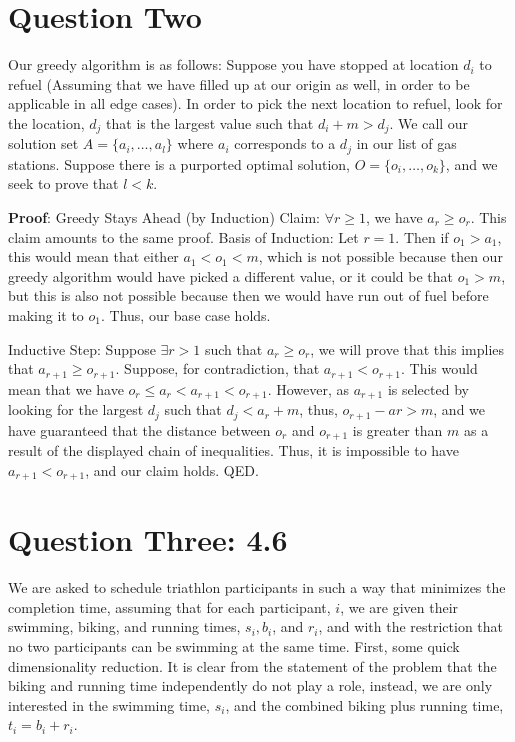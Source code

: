 \documentclass[11pt,letterpaper]{article}
\begin{document}
\section*{Question Two}
Our greedy algorithm is as follows: Suppose you have stopped at location $d_i$ to refuel (Assuming that we have filled up at our origin as well, in order to be applicable in all edge cases). In order to pick the next location to refuel, look for the location, $d_j$ that is the largest value such that $d_i + m > d_j$. 
We call our solution set $A = \{ a_i,\ldots, a_l\}$ where $a_i$ corresponds to a $d_j$ in our list of gas stations. Suppose there is a purported optimal solution, $O = \{o_i, \ldots, o_k\}$, and we seek to prove that $l < k$. 

\textbf{Proof}: Greedy Stays Ahead (by Induction)
Claim: $\forall r \geq 1$, we have $a_r \geq o_r$. This claim amounts to the same proof. 
Basis of Induction: Let $r=1$. Then if $o_1 > a_1$, this would mean that either $a_1 < o_1 < m$, which is not possible because then our greedy algorithm would have picked a different value, or it could be that $o_1 > m$, but this is also not possible because then we would have run out of fuel before making it to $o_1$. Thus, our base case holds. 

Inductive Step: Suppose $\exists r > 1$ such that $a_r \geq o_r$, we will prove that this implies that $a_{r+1} \geq o_{r+1}$. Suppose, for contradiction, that $a_{r+1} < o_{r+1}$. This would mean that we have $o_r \leq a_r < a_{r+1} < o_{r+1}$. However, as $a_{r+1}$ is selected by looking for the largest $d_j$ such that $d_j < a_r + m$, thus, $o_{r+1} - a{r} > m$, and we have guaranteed that the distance between $o_r$ and $o_{r+1}$ is greater than $m$ as a result of the displayed chain of inequalities. Thus, it is impossible to have $a_{r+1} < o_{r+1}$, and our claim holds. QED. 

\section*{Question Three: 4.6}
We are asked to schedule triathlon participants in such a way that minimizes the completion time, assuming that for each participant, $i$, we are given their swimming, biking, and running times, $s_i, b_i$, and $r_i$, and with the restriction that no two participants can be swimming at the same time. First, some quick dimensionality reduction. It is clear from the statement of the problem that the biking and running time independently do not play a role, instead, we are only interested in the swimming time, $s_i$, and the combined biking plus running time, $t_i = b_i + r_i$. 
\end{document}

